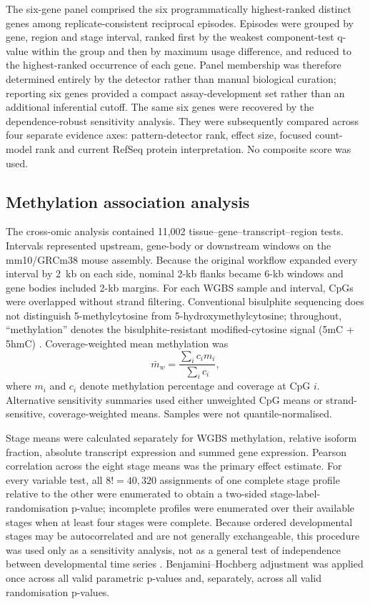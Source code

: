 \documentclass[11pt,a4paper]{article}
\begin{document}
The six-gene panel comprised the six programmatically highest-ranked distinct genes among replicate-consistent reciprocal episodes. Episodes were grouped by gene, region and stage interval, ranked first by the weakest component-test q-value within the group and then by maximum usage difference, and reduced to the highest-ranked occurrence of each gene. Panel membership was therefore determined entirely by the detector rather than manual biological curation; reporting six genes provided a compact assay-development set rather than an additional inferential cutoff. The same six genes were recovered by the dependence-robust sensitivity analysis. They were subsequently compared across four separate evidence axes: pattern-detector rank, effect size, focused count-model rank and current RefSeq protein interpretation. No composite score was used.

\subsection{Methylation association analysis}

The cross-omic analysis contained 11,002 tissue--gene--transcript--region tests. Intervals represented upstream, gene-body or downstream windows on the mm10/GRCm38 mouse assembly. Because the original workflow expanded every interval by 2~kb on each side, nominal 2-kb flanks became 6-kb windows and gene bodies included 2-kb margins. For each WGBS sample and interval, CpGs were overlapped without strand filtering. Conventional bisulphite sequencing does not distinguish 5-methylcytosine from 5-hydroxymethylcytosine; throughout, ``methylation'' denotes the bisulphite-resistant modified-cytosine signal (5mC + 5hmC) \citep{huang_bisulfite_5hmc_2010,lister_brain_methylome_2013}. Coverage-weighted mean methylation was
\begin{equation}
\bar{m}_{w}=\frac{\sum_i c_i m_i}{\sum_i c_i},
\end{equation}
where $m_i$ and $c_i$ denote methylation percentage and coverage at CpG $i$. Alternative sensitivity summaries used either unweighted CpG means or strand-sensitive, coverage-weighted means. Samples were not quantile-normalised.

Stage means were calculated separately for WGBS methylation, relative isoform fraction, absolute transcript expression and summed gene expression. Pearson correlation across the eight stage means was the primary effect estimate. For every variable test, all $8!=40{,}320$ assignments of one complete stage profile relative to the other were enumerated to obtain a two-sided stage-label-randomisation p-value; incomplete profiles were enumerated over their available stages when at least four stages were complete. Because ordered developmental stages may be autocorrelated and are not generally exchangeable, this procedure was used only as a sensitivity analysis, not as a general test of independence between developmental time series \citep{romano_tirlea_2022,yuan_shou_2024}. Benjamini--Hochberg adjustment was applied once across all valid parametric p-values and, separately, across all valid randomisation p-values.
\end{document}
